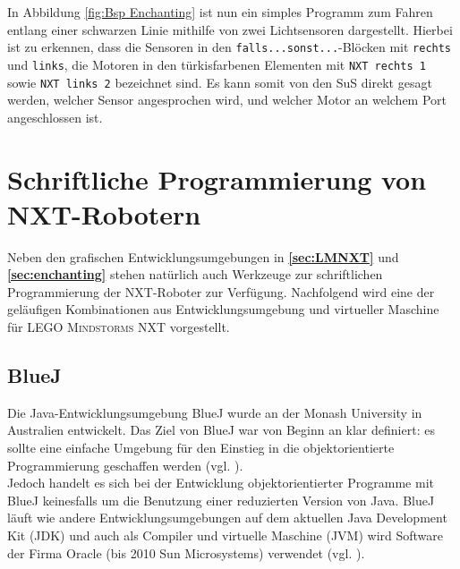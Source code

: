 \documentclass[paper=a4, DIV=14, BCOR=15mm, twoside=on, onecolumn=on, open = right, titlepage =on, parskip =half, headsepline = on, footsepline = on, chapterprefix = on, appendixprefix = off, fontsize = 12pt, numbers = noenddot, abstract = on]{scrbook}
\begin{document}
In Abbildung \ref{fig:Bsp Enchanting} ist nun ein simples Programm zum Fahren entlang einer schwarzen Linie mithilfe von zwei Lichtsensoren dargestellt. Hierbei ist zu erkennen, dass die Sensoren in den \texttt{falls...sonst...}-Blöcken mit \texttt{rechts} und \texttt{links}, die Motoren in den türkisfarbenen Elementen mit \texttt{NXT rechts 1} sowie \texttt{NXT links 2} bezeichnet sind. Es kann somit von den SuS direkt gesagt werden, welcher Sensor angesprochen wird, und welcher Motor an welchem Port angeschlossen ist.

\section{Schriftliche Programmierung von NXT-Robotern}
\label{sec:bluejetc}
Neben den grafischen Entwicklungsumgebungen in \textbf{\ref{sec:LMNXT}} und \textbf{\ref{sec:enchanting}} stehen natürlich auch Werkzeuge zur schriftlichen Programmierung der NXT-Roboter zur Verfügung. Nachfolgend wird eine der geläufigen Kombinationen aus Entwicklungsumgebung und virtueller Maschine für \textsc{LEGO Mindstorms} NXT vorgestellt. 

\subsection{BlueJ}
\label{sec:bluej}
Die Java-Entwicklungsumgebung BlueJ wurde an der Monash University in Australien entwickelt. Das Ziel von BlueJ war von Beginn an klar definiert: es sollte eine einfache Umgebung für den Einstieg in die objektorientierte Programmierung geschaffen werden (vgl. \cite[S.14]{barnes:03}).\\
Jedoch handelt es sich bei der Entwicklung objektorientierter Programme mit BlueJ keinesfalls um die Benutzung einer reduzierten Version von Java. BlueJ läuft wie andere Entwicklungsumgebungen auf dem aktuellen Java Development Kit (JDK) und auch als Compiler und virtuelle Maschine (JVM) wird Software der Firma Oracle (bis 2010 Sun Microsystems) verwendet (vgl. \cite[S.15]{barnes:03}).
\end{document}
